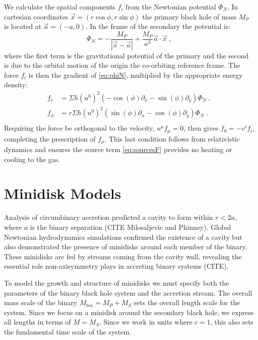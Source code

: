 \documentclass{emulateapj}
\newcommand{\Sig}{\Sigma}
\begin{document}
We calculate the spatial components $f_i$ from the Newtonian potential $\Phi_N$.  In cartesian coordinates $\vec{x}=(r \cos \phi, r \sin \phi)$ the primary black hole of mass $M_P$ is located at $\vec a = (-a, 0)$.  In the frame of the secondary the potential is:
\begin{equation}
	\Phi_N = -\frac{M_P}{|\vec{x} -  \vec{a} |} + \frac{M_P}{a^3}  \vec{a} \cdot \vec{x} \ , \label{eq:phiN}
\end{equation}
where the first term is the gravitational potential of the primary and the second is due to the orbital motion of the origin the co-orbiting reference frame.  The force $f_i$ is then the gradient of \eqref{eq:phiN}, multiplied by the appropriate energy density:
\begin{align}
	f_r &= \Sig h (u^0)^2 \left( -\cos(\phi) \partial_x  - \sin(\phi)\partial_y\right) \Phi_N \ ,\nonumber \\
	f_\phi &= r\Sig h (u^0)^2 \left( \sin(\phi) \partial_x  -\cos(\phi)\partial_y\right) \Phi_N \ .\nonumber \\
\end{align}
Requiring the force be orthogonal to the velocity, $u^\mu f_\mu = 0$, then gives $f_0 = -v^i f_i$, completing the prescription of $f_\mu$. This last condition follows from relativistic dynamics and ensures the source term \eqref{eq:sourcesF} provides no heating or cooling to the gas.


\section{Minidisk Models}
\label{sec:models}

Analysis of circumbinary accretion predicted a cavity to form within $r<2a$, where $a$ is the binary separation (CITE Milosaljevic and Phinney). Global Newtonian hydrodynamics simulations confirmed the existence of a cavity but also demonstrated the presence of minidisks around each member of the binary.  These minidisks are fed by streams coming from the cavity wall, revealing the essential role non-axisymmetry plays in accreting binary systems (CITE).

To model the growth and structure of minidisks we must specify both the parameters of the binary black hole system and the accretion stream.  The overall mass scale of the binary $M_{bin} = M_P+M_S$ sets the overall length scale for the system.  Since we focus on a minidisk around the secondary black hole, we express all lengths in terms of $M = M_S$.  Since we work in units where $c=1$, this also sets the fundamental time scale of the system.  
\end{document}
